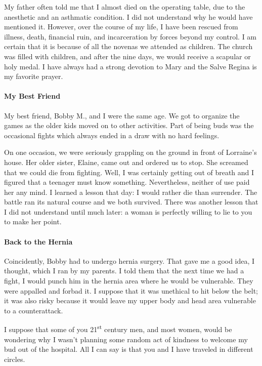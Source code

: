 My father often told me that I almost died on the operating table, due to the anesthetic and an asthmatic condition. I did not understand why he would have mentioned it. However, over the course of my life, I have been rescued from illness, death, financial ruin, and incarceration by forces beyond my control. I am certain that it is because of all the novenas we attended as children. The church was filled with children, and after the nine days, we would receive a scapular or holy medal. I have always had a strong devotion to Mary and the Salve Regina is my favorite prayer.

\paragraph{My Best Friend}


My best friend, Bobby M., and I were the same age. We got to organize the games as the older kids moved on to other activities. Part of being buds was the occasional fights which always ended in a draw with no hard feelings.

On one occasion, we were seriously grappling on the ground in front of Lorraine's house. Her older sister, Elaine, came out and ordered us to stop. She screamed that we could die from fighting. Well, I was certainly getting out of breath and I figured that a teenager must know something. Nevertheless, neither of use paid her any mind. I learned a lesson that day: I would rather die than surrender. The battle ran its natural course and we both survived. There was another lesson that I did not understand until much later: a woman is perfectly willing to lie to you to make her point.

\paragraph{Back to the Hernia}


Coincidently, Bobby had to undergo hernia surgery. That gave me a good idea, I thought, which I ran by my parents. I told them that the next time we had a fight, I would punch him in the hernia area where he would be vulnerable. They were appalled and forbad it. I suppose that it was unethical to hit below the belt; it was also risky because it would leave my upper body and head area vulnerable to a counterattack.

I suppose that some of you 21\textsuperscript{st} century men, and most women, would be wondering why I wasn't planning some random act of kindness to welcome my bud out of the hospital. All I can say is that you and I have traveled in different circles.

